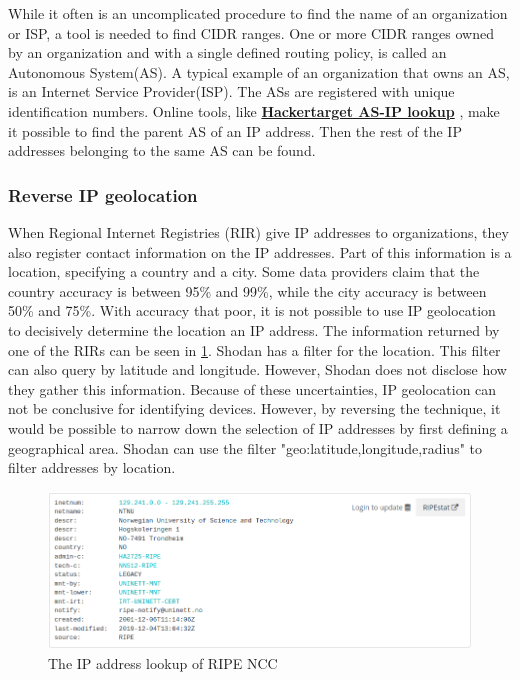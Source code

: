 While it often is an uncomplicated procedure to find the name of an organization or ISP, a tool is needed to find CIDR ranges. One or more CIDR ranges owned by an organization and with a single defined routing policy, is called an Autonomous System(AS). A typical example of an organization that owns an AS, is an Internet Service Provider(ISP). \cite{AS_def} 
The ASs are registered with unique identification numbers. Online tools, like \href{https://hackertarget.com/as-ip-lookup/}{\textbf{Hackertarget AS-IP lookup}} \cite{asip_lookup}, make it possible to find the parent AS of an IP address. Then the rest of the IP addresses belonging to the same AS can be found.


\subsubsection{Reverse IP geolocation} \label{sec:geo_method}
When Regional Internet Registries (RIR) give IP addresses to organizations, they also register contact information on the IP addresses. Part of this information is a location, specifying a country and a city. Some data providers claim that the country accuracy is between 95\% and 99\%, while the city accuracy is between 50\% and 75\%.\cite{geolocation_acc} With accuracy that poor, it is not possible to use IP geolocation to decisively determine the location an IP address. The information returned by one of the RIRs can be seen in \cref{fig:RIPE_NCC}.
Shodan has a filter for the location. This filter can also query by latitude and longitude. However, Shodan does not disclose how they gather this information. 
Because of these uncertainties, IP geolocation can not be conclusive for identifying devices. However, by reversing the technique, it would be possible to narrow down the selection of IP addresses by first defining a geographical area. Shodan can use the filter "geo:latitude,longitude,radius" to filter addresses by location.  

\begin{figure} [H]
    \centering
    \includegraphics[scale=0.5]{Figurer/ripe.png}
    \caption{The IP address lookup of RIPE NCC \cite{ripe_whois}}
    \label{fig:RIPE_NCC}
\end{figure}

